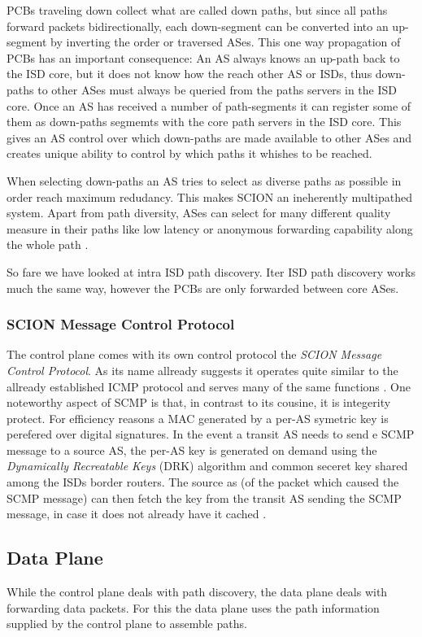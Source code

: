 \documentclass[../eva1_scion.tex]{subfiles}
\begin{document}
    PCBs traveling down collect what are called down paths, but since all paths forward packets bidirectionally, each down-segment can be converted into an up-segment by inverting the order or traversed ASes. This one way propagation of PCBs has an important consequence: An AS always knows an up-path back to the ISD core, but it does not know how the reach other AS or ISDs, thus down-paths to other ASes must always be queried from the paths servers in the ISD core. Once an AS has received a number of path-segments it can register some of them as down-paths segmemts with the core path servers in the ISD core. This gives an AS control over which down-paths are made available to other ASes and creates unique ability to control by which paths it whishes to be reached.

    When selecting down-paths an AS tries to select as diverse paths as possible in order reach maximum redudancy. This makes SCION an ineherently multipathed system. Apart from path diversity, ASes can select for many different quality measure in their paths like low latency or anonymous forwarding capability along the whole path \cite{scion_2011}.

    So fare we have looked at intra ISD path discovery. Iter ISD path discovery works much the same way, however the PCBs are only forwarded between core ASes.
    
    \subsubsection{SCION Message Control Protocol}
    The control plane comes with its own control protocol the \textit{SCION Message Control Protocol}. As its name allready suggests it operates quite similar to the allready established ICMP protocol and serves many of the same functions \cite{scion_2015}. One noteworthy aspect of SCMP is that, in contrast to its cousine, it is integerity protect. For efficiency reasons a MAC generated by a per-AS symetric key is perefered over digital signatures. In the event a transit AS needs to send e SCMP message to a source AS, the per-AS key is generated on demand using the \textit{Dynamically Recreatable Keys} (DRK) algorithm and common seceret key shared among the ISDs border routers. The source as (of the packet which caused the SCMP message) can then fetch the key from the transit AS sending the SCMP message, in case it does not already have it cached \cite{scion_2015}. 

    \subsection{Data Plane}
    While the control plane deals with path discovery, the data plane deals with forwarding data packets. For this the data plane uses the path information supplied by the control plane to assemble paths.
\end{document}
